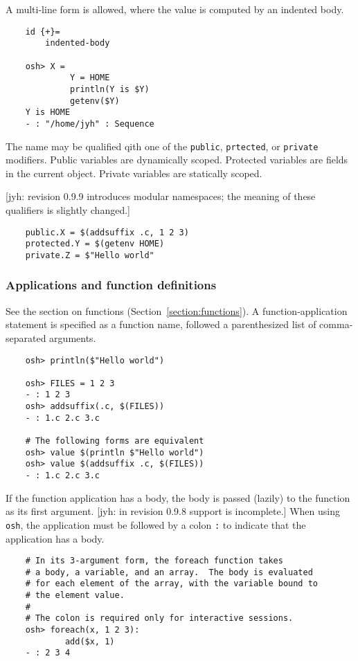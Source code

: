 A multi-line form is allowed, where the value is computed by an indented body.

\begin{verbatim}
    id {+}=
        indented-body

    osh> X =
             Y = HOME
             println(Y is $Y)
             getenv($Y)
    Y is HOME
    - : "/home/jyh" : Sequence
\end{verbatim}

The name may be qualified qith one of the \verb+public+, \verb+prtected+, or \verb+private+
modifiers.  Public variables are dynamically scoped.  Protected variables are fields in the current
object.  Private variables are statically scoped.

[jyh: revision 0.9.9 introduces modular namespaces; the meaning of these qualifiers is slightly changed.]

\begin{verbatim}
    public.X = $(addsuffix .c, 1 2 3)
    protected.Y = $(getenv HOME)
    private.Z = $"Hello world"
\end{verbatim}

\subsubsection{Applications and function definitions}

See the section on functions (Section~\ref{section:functions}).  A function-application statement is specified as a
function name, followed a parenthesized list of comma-separated arguments.

\begin{verbatim}
    osh> println($"Hello world")

    osh> FILES = 1 2 3
    - : 1 2 3
    osh> addsuffix(.c, $(FILES))
    - : 1.c 2.c 3.c

    # The following forms are equivalent
    osh> value $(println $"Hello world")
    osh> value $(addsuffix .c, $(FILES))
    - : 1.c 2.c 3.c
\end{verbatim}

If the function application has a body, the body is passed (lazily) to the function as its first
argument.  [jyh: in revision 0.9.8 support is incomplete.]  When using \verb+osh+, the application
must be followed by a colon \verb+:+ to indicate that the application has a body.

\begin{verbatim}
    # In its 3-argument form, the foreach function takes
    # a body, a variable, and an array.  The body is evaluated
    # for each element of the array, with the variable bound to
    # the element value.
    #
    # The colon is required only for interactive sessions.
    osh> foreach(x, 1 2 3):
            add($x, 1)
    - : 2 3 4
\end{verbatim}

